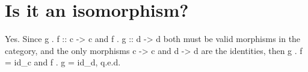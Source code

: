 \section{ Is it an isomorphism? }

Yes. Since g . f :: c -> c and f . g :: d -> d both must be valid morphisms
in the category, and the only morphisms c -> c and d -> d are the identities,
then g . f = id_c and f . g = id_d, q.e.d.
